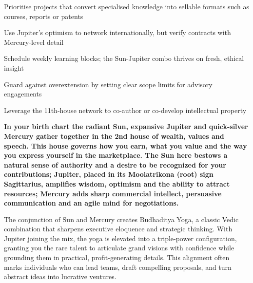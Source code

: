 \begin{diamondlist}
  \item {\fontsize{8.5}{12}\selectfont Prioritise projects that convert specialised knowledge into sellable formats such as courses, reports or patents}
  \item {\fontsize{8.5}{12}\selectfont Use Jupiter's optimism to network internationally, but verify contracts with Mercury-level detail}
  \item {\fontsize{8.5}{12}\selectfont Schedule weekly learning blocks; the Sun-Jupiter combo thrives on fresh, ethical insight}
  \item {\fontsize{8.5}{12}\selectfont Guard against overextension by setting clear scope limits for advisory engagements}
  \item {\fontsize{8.5}{12}\selectfont Leverage the 11th-house network to co-author or co-develop intellectual property}
\end{diamondlist}


\label{topic23}

{\fontsize{9.5}{13.8}\selectfont\bfseries\color{DeepSlate} In your birth chart the radiant Sun, expansive Jupiter and quick-silver Mercury gather together in the 2nd house of wealth, values and speech. This house governs how you earn, what you value and the way you express yourself in the marketplace. The Sun here bestows a natural sense of authority and a desire to be recognized for your contributions; Jupiter, placed in its Moolatrikona (root) sign Sagittarius, amplifies wisdom, optimism and the ability to attract resources; Mercury adds sharp commercial intellect, persuasive communication and an agile mind for negotiations.}\par\vspace{2mm}

{\fontsize{9}{13}\selectfont The conjunction of Sun and Mercury creates Budhaditya Yoga, a classic Vedic combination that sharpens executive eloquence and strategic thinking. With Jupiter joining the mix, the yoga is elevated into a triple-power configuration, granting you the rare talent to articulate grand visions with confidence while grounding them in practical, profit-generating details. This alignment often marks individuals who can lead teams, draft compelling proposals, and turn abstract ideas into lucrative ventures.}\par\vspace{1.8mm}


